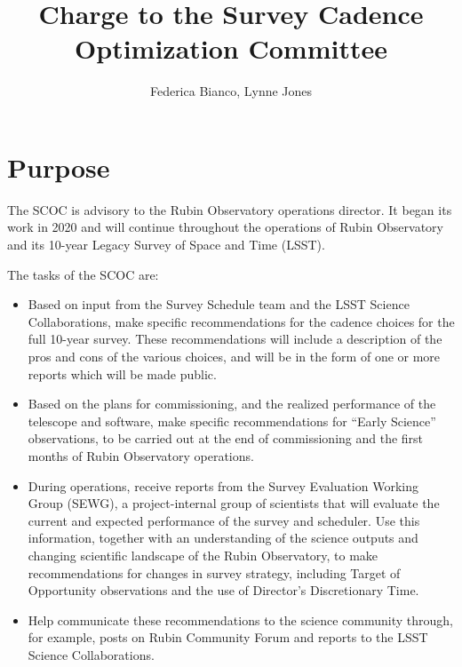 \documentclass[OPS,lsstdraft,authoryear,toc]{lsstdoc}
\title{Charge to the Survey Cadence Optimization Committee}
\author{%
Federica Bianco, Lynne Jones
}
\date{\vcsDate}
\begin{document}
\maketitle


\section{Purpose}

The SCOC is advisory to the Rubin Observatory operations director.
It began its work in 2020 and will continue throughout the operations
of Rubin Observatory and its 10-year Legacy Survey of Space and Time (LSST). 

The tasks of the SCOC are:

\begin{itemize}
\item Based on input from the Survey Schedule team and the LSST Science Collaborations, make specific recommendations for the cadence choices for the full 10-year survey. These recommendations will include a description of the pros and cons of the various choices, and will be in the form of one or more reports which will be made public.
\item Based on the plans for commissioning, and the realized performance of the telescope and software, make specific recommendations for “Early Science” observations, to be carried out at the end of commissioning and the first months of Rubin Observatory operations.
\item During operations, receive reports from the Survey Evaluation Working Group (SEWG), a project-internal group of scientists that will evaluate the current and expected performance of the survey and scheduler. Use this information, together with an understanding of the science outputs and changing scientific landscape of the Rubin Observatory, to make recommendations for changes in survey strategy, including Target of Opportunity observations and the use of Director’s Discretionary Time.
\item Help communicate these recommendations to the science community through, for example, posts on Rubin Community Forum and reports to the LSST Science Collaborations.

\end{itemize}
\end{document}
